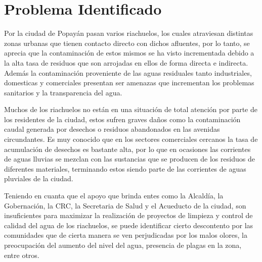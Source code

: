 \section{Problema Identificado}
  Por la ciudad de Popayán pasan varios riachuelos, los cuales atraviesan distintas zonas urbanas que tienen contacto directo con dichos afluentes, por lo tanto, se aprecia que la contaminación de estos mismos se ha visto incrementada debido a la alta tasa de residuos que son arrojadas en ellos de forma directa e indirecta. Además la contaminación proveniente de las aguas residuales tanto industriales, domesticas y comerciales presentan ser amenazas que incrementan los problemas sanitarios y la transparencia del agua.

  Muchos de los riachuelos no están en una situación de total atención por parte de los residentes de la ciudad, estos sufren graves daños como la contaminación caudal generada por desechos o residuos abandonados en las avenidas circundantes. Es muy conocido que en los sectores comerciales cercanos la tasa de acumulación de desechos es bastante alta, por lo que en ocasiones las corrientes de aguas lluvias se mezclan con las sustancias que se producen de los residuos de diferentes materiales, terminando estos siendo parte de las corrientes de aguas pluviales de la ciudad.
  
  Teniendo en cuanta que el apoyo que brinda entes como la Alcaldía, la Gobernación, la CRC, la Secretaria de Salud y el Acueducto de la ciudad, son insuficientes para maximizar la realización de proyectos de limpieza y control de calidad del agua de los riachuelos, se puede identificar cierto descontento por las comunidades que de cierta manera se ven perjudicadas por los malos olores, la preocupación del aumento del nivel del agua, presencia de plagas en la zona, entre otros. 

